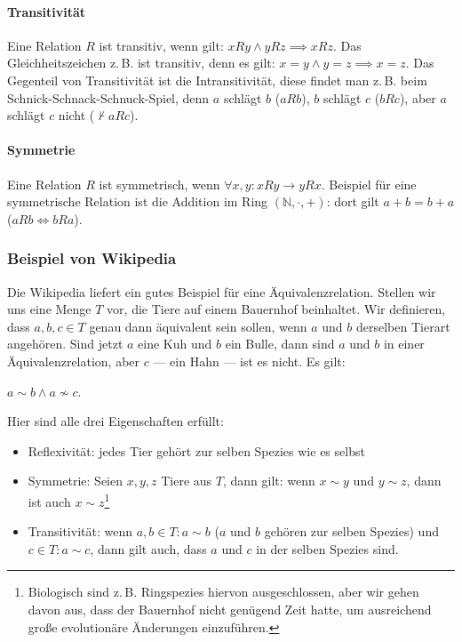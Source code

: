 \documentclass{scrartcl}
\begin{document}
\paragraph{Transitivität} Eine Relation $R$ ist transitiv, wenn gilt: $xRy \wedge yRz \implies xRz$. Das Gleichheitszeichen z.\,B. ist transitiv, denn
es gilt: $x = y \wedge y = z \implies x = z$. Das Gegenteil von Transitivität ist die Intransitivität, diese findet man z.\,B. beim Schnick-Schnack-Schnuck-Spiel,
denn $a$ schlägt $b$ ($aRb$), $b$ schlägt $c$ ($bRc$), aber $a$ schlägt $c$ nicht ($\not\vdash aRc$).

\paragraph{Symmetrie} Eine Relation $R$ ist symmetrisch, wenn $\forall x, y: xRy \longrightarrow yRx$. Beispiel für eine symmetrische Relation ist die Addition im
Ring $(\mathbb{N}, \cdot, +)$: dort gilt $a + b = b + a$ ($aRb \Leftrightarrow bRa$).

\subsubsection{Beispiel von Wikipedia}

Die Wikipedia liefert ein gutes Beispiel für eine Äquivalenzrelation.
Stellen wir uns eine Menge $T$ vor, die Tiere auf einem Bauernhof beinhaltet.
Wir definieren, dass $a, b, c \in T$ genau dann äquivalent sein sollen, wenn
$a$ und $b$ derselben Tierart angehören. 
Sind jetzt $a$ eine Kuh und $b$ ein Bulle, dann sind $a$ und $b$ in einer
Äquivalenzrelation, aber $c$ --- ein Hahn --- ist es nicht. Es gilt:

$a \sim b \wedge a \not\sim c$.

Hier sind alle drei Eigenschaften erfüllt:

\begin{itemize}
	\item Reflexivität: jedes Tier gehört zur selben Spezies wie es selbst
	\item Symmetrie: Seien $x, y, z$ Tiere aus $T$, dann gilt: wenn $x \sim y$ und
		$y \sim z$, dann ist auch $x \sim z$\footnote{Biologisch
		sind z.\,B. Ringspezies hiervon ausgeschlossen, aber wir gehen
		davon aus, dass der Bauernhof nicht genügend Zeit hatte, um
		ausreichend große evolutionäre Änderungen einzuführen.}
	\item Transitivität: wenn $a, b \in T: a \sim b$ ($a$ und $b$ gehören
		zur selben Spezies) und $c \in T: a \sim c$, dann gilt auch,
		dass $a$ und $c$ in der selben Spezies sind.
\end{itemize}
\end{document}
